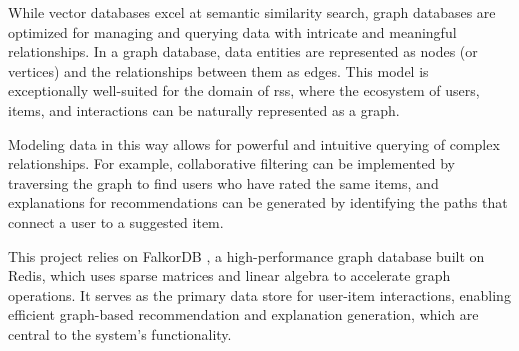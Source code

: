 While vector databases excel at semantic similarity search, graph databases are optimized for managing and querying data with intricate and meaningful relationships. In a graph database, data entities are represented as nodes (or vertices) and the relationships between them as edges. This model is exceptionally well-suited for the domain of \aclp{rs}, where the ecosystem of users, items, and interactions can be naturally represented as a graph.

Modeling data in this way allows for powerful and intuitive querying of complex relationships. For example, collaborative filtering can be implemented by traversing the graph to find users who have rated the same items, and explanations for recommendations can be generated by identifying the paths that connect a user to a suggested item.

This project relies on FalkorDB \cite{FALKORDB}, a high-performance graph database built on Redis, which uses sparse matrices and linear algebra to accelerate graph operations. It serves as the primary data store for user-item interactions, enabling efficient graph-based recommendation and explanation generation, which are central to the system's functionality.

